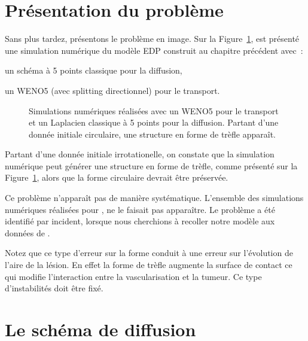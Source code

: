 \documentclass[main.tex]{subfiles}
\begin{document}
\section{Présentation du problème}
Sans plus tardez, présentons le problème en image. Sur la Figure~\ref{fig:trefle}, est présenté une simulation numérique du modèle EDP construit au chapitre précédent avec~:
\begin{myitemize}
\item un schéma à 5 points classique pour la diffusion,
\item un WENO5 (avec splitting directionnel) pour le transport.
\end{myitemize}
\begin{figure}
\centering
\caption{\label{fig:trefle} Simulations numériques réalisées avec un WENO5 pour le transport et un Laplacien classique à 5 points pour la diffusion. Partant d'une donnée initiale circulaire, 
une structure en forme de trèfle apparaît.}
\end{figure}

Partant d'une donnée initiale irrotationelle, on constate que la simulation numérique peut générer une structure en forme de trèfle, comme présenté sur la Figure~\ref{fig:trefle}, alors que la forme circulaire devrait être préservée. 

Ce problème n'apparaît pas de manière systématique. L'ensemble des simulations numériques réalisées pour \Nber, ne le faisait pas apparaître. Le problème a été identifié par incident, lorsque nous cherchions à recoller notre modèle aux données de \Chen. 


Notez que ce type d'erreur sur la forme conduit à une erreur sur l'évolution de l'aire de la lésion. En effet la forme de trèfle augmente la surface de contact ce qui modifie l'interaction entre la vascularisation et la tumeur. Ce type d'instabilités doit être fixé.


\section{Le schéma de diffusion}
\end{document}
